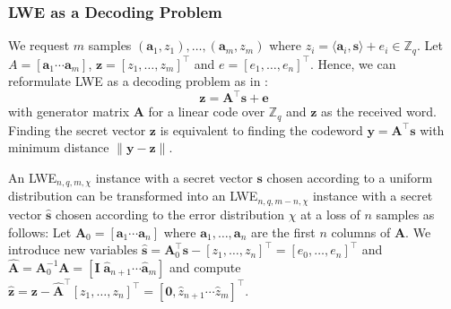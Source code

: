 \documentclass[
  a4paper,  %
  twoside,  %
  bibliography=totoc,
  headsepline,
  cleardoublepage=empty,
  parskip=half,
  draft=false
]{scrbook}
\begin{document}
\subsubsection{LWE as a Decoding Problem} \label{sec:lwe-decoding}
We request $m$ samples $(\mathbf{a}_1, z_1), \ldots, (\mathbf{a}_m, z_m)$ where $z_i = \langle \mathbf{a}_i, \mathbf{s} \rangle + e_i \in \mathbb{Z}_q$. Let $A = \left[ \mathbf{a}_1 \cdots \mathbf{a}_m\right]$, $\mathbf{z} = \left[z_1, \ldots, z_m\right]^\intercal$ and $e = \left[e_1, \ldots, e_n\right]^\intercal$. Hence, we can reformulate LWE as a decoding problem as in \cite{GJS15}:
\begin{equation} \label{eq:lwe-decoding}
  \mathbf{z} =  \mathbf{A}^\intercal \mathbf{s} + \mathbf{e}
\end{equation} %
with generator matrix $\mathbf{A}$ for a linear code over $\mathbb{Z}_q$ and $\mathbf{z}$ as the received word. Finding the secret vector $\mathbf{z}$ is equivalent to finding the codeword $\mathbf{y} = \mathbf{A}^\intercal\mathbf{s}$ with minimum distance $\| \mathbf{y} - \mathbf{z} \|$. 

An LWE$_{n, q, m, \chi}$ instance with a secret vector $\mathbf{s}$ chosen according to a uniform distribution can be transformed into an LWE$_{n, q, m-n, \chi}$ instance with a secret vector $\hat{\mathbf{s}}$ chosen according to the error distribution $\chi$ at a loss of $n$ samples as follows: Let $\mathbf{A}_0 = \left[ \mathbf{a}_1 \cdots \mathbf{a}_n\right]$ where $\mathbf{a}_1, \ldots, \mathbf{a}_n$ are the first $n$ columns of $\mathbf{A}$. We introduce new variables $\hat{\mathbf{s}} = \mathbf{A}^\intercal_0 \mathbf{s}  - \left[z_1, \ldots, z_n\right]^\intercal = \left[e_0, \ldots, e_n\right]^\intercal$ and $\hat{\mathbf{A}} = \mathbf{A}_0^{-1} \mathbf{A} = \left[\mathbf{I} \; \hat{\mathbf{a}}_{n+1} \cdots \hat{\mathbf{a}}_{m}\right]$ and compute $\hat{\mathbf{z}} = \mathbf{z} -  \hat{\mathbf{A}}^\intercal \left[z_1, \ldots, z_n\right]^\intercal  = \left[\mathbf{0}, \hat{z}_{n+1} \cdots \hat{z}_{m} \right]^\intercal$. %

\end{document}
